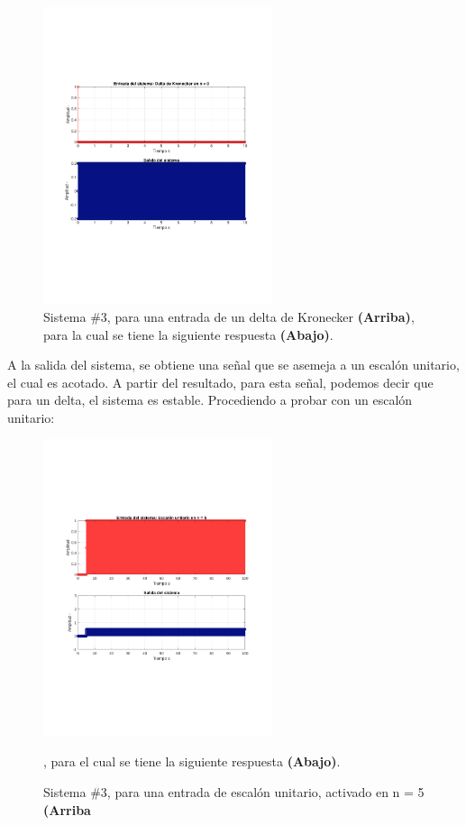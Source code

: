 			\begin{figure}[H]
				\center
				\includegraphics[width=0.6\textwidth,clip, trim = {2cm 7.0cm 2.2cm 7.0cm}]{../imgs/sistema_3_bibo_n_0.pdf}
				\caption{Sistema \#3, para una entrada de un delta de Kronecker \textbf{(Arriba)}, para la cual se tiene la siguiente respuesta \textbf{(Abajo)}.}
				\label{fig:s_3_bibo_n_0}
			\end{figure}
		
			A la salida del sistema, se obtiene una señal que se asemeja a un escalón unitario, el cual es acotado. A partir del resultado, para esta señal, podemos decir que para un delta, el sistema es estable. Procediendo a probar con un escalón unitario:
		
			\begin{figure}[H]
				\center
				\includegraphics[width=0.6\textwidth,clip, trim = {2cm 7.0cm 2.2cm 7.0cm}]{../imgs/sistema_3_bibo_heaviside_n_5.pdf}
				\caption{Sistema \#3, para una entrada de escalón unitario, activado en n = 5 \textbf{(Arriba}}, para el cual se tiene la siguiente respuesta \textbf{(Abajo)}. 
				\label{fig:s_3_bibo_heaviside_n_5}
			\end{figure}
		
